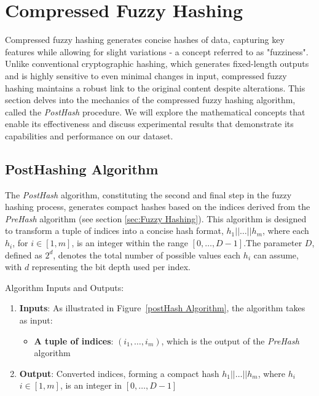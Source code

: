 \newpage


\section{Compressed Fuzzy Hashing}
\label{sec:Compressed Fuzzy Hashing}

Compressed fuzzy hashing generates concise hashes of data, capturing key features while allowing for slight variations - a concept referred to as "fuzziness". Unlike conventional cryptographic hashing, which generates fixed-length outputs and is highly sensitive to even minimal changes in input, compressed fuzzy hashing maintains a robust link to the original content despite alterations.
This section delves into the mechanics of the compressed fuzzy hashing algorithm, called the \textit{PostHash} procedure. We will explore the mathematical concepts that enable its effectiveness and discuss experimental results that demonstrate its capabilities and performance on our dataset.

\subsection{PostHashing Algorithm}

The \textit{PostHash} algorithm, constituting the second and final step in the fuzzy hashing process, generates compact hashes based on the indices derived from the \textit{PreHash} algorithm (see section \ref{sec:Fuzzy Hashing}). This algorithm is designed to transform a tuple of indices into a concise hash format, \(h_1 || \ldots || h_m\), where each \(h_i\), for \(i \in [1, m]\), is an integer within the range \([0, \ldots, D-1]\).The parameter \(D\), defined as \(2^d\), denotes the total number of possible values each \(h_i\) can assume, with \(d\) representing the bit depth used per index. 

Algorithm Inputs and Outputs:
\begin{enumerate}
    \item \textbf{Inputs}: As illustrated in Figure~\ref{postHash Algorithm}, the algorithm takes as input:
    \begin{itemize}
        \item \textbf{A tuple of indices}: \((i_1, \ldots, i_m)\), which is the output of the \textit{PreHash} algorithm
    \end{itemize}
    \item \textbf{Output}: Converted indices, forming a compact hash \(h_1|| \ldots || h_m\), where \(h_i\) \(i \in [1, m]\), is an integer in \([0, \ldots, D-1]\)
\end{enumerate}

